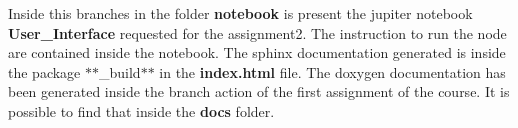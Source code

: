 Inside this branches in the folder {\bfseries{notebook}} is present the jupiter notebook {\bfseries{User\+\_\+\+Interface}} requested for the assignment2. The instruction to run the node are contained inside the notebook. The sphinx documentation generated is inside the package $\ast$$\ast$\+\_\+build$\ast$$\ast$ in the {\bfseries{index.\+html}} file. The doxygen documentation has been generated inside the branch action of the first assignment of the course. It is possible to find that inside the {\bfseries{docs}} folder. 